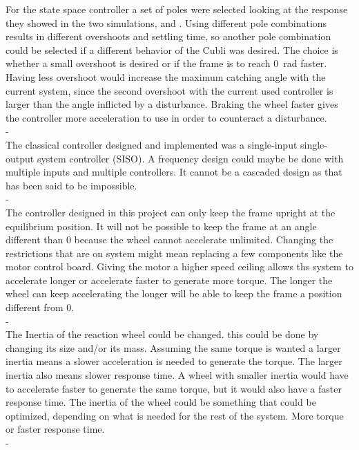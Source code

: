 For the state space controller a set of poles were selected looking at the response they showed in the two simulations,  and . Using different pole combinations results in different overshoots and settling time, so another pole combination could be selected if a different behavior of the Cubli was desired. 
The choice is whether a small overshoot is desired or if the frame is to reach \SI{0}{rad} faster. 
Having less overshoot would increase the maximum catching angle with the current system, since the second overshoot with the current used controller is larger than the angle inflicted by a disturbance. 
Braking the wheel faster gives the controller more acceleration to use in order to counteract a disturbance. 
\\-\\
The classical controller designed and implemented was a single-input single-output system controller (SISO). A frequency design could maybe be done with multiple inputs and multiple controllers. It cannot be a cascaded design as that has been said to be impossible. 
\\-\\
The controller designed in this project can only keep the frame upright at the equilibrium position. It will not be possible to keep the frame at an angle different than \si{0^\circ} because the wheel cannot accelerate unlimited. Changing the restrictions that are on system might mean replacing a few components like the motor control board. Giving the motor a higher speed ceiling allows ths system to accelerate longer or accelerate faster to generate more torque. The longer the wheel can keep accelerating the longer will be able to keep the frame a position different from \si{0^\circ}.
\\-\\
The Inertia of the reaction wheel could be changed. this could be done by changing its size and/or its mass. Assuming the same torque is wanted a larger inertia means a slower acceleration is needed to generate the torque. The larger inertia also means slower response time. A wheel with smaller inertia would have to accelerate faster to generate the same torque, but it would also have a faster response time.  The inertia of the wheel could be something that could be optimized, depending on what is needed for the rest of the system. More torque or faster response time.
\\-\\
